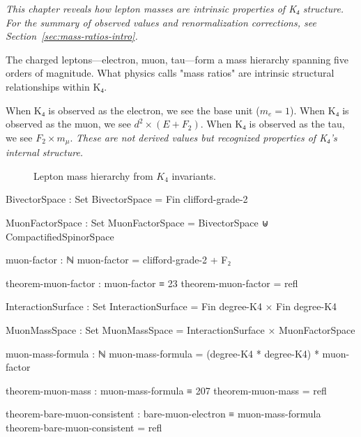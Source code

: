 \documentclass[11pt,a4paper]{book}
\begin{document}
\noindent\textit{This chapter reveals how lepton masses are intrinsic properties of K₄ structure. For the summary of observed values and renormalization corrections, see Section~\ref{sec:mass-ratios-intro}.}

\medskip
The charged leptons---electron, muon, tau---form a mass hierarchy spanning five orders of magnitude. What physics calls "mass ratios" are intrinsic structural relationships within K₄.

When K₄ is observed as the electron, we see the base unit ($m_e = 1$). When K₄ is observed as the muon, we see $d^2 \times (E + F_2)$. When K₄ is observed as the tau, we see $F_2 \times m_\mu$. \emph{These are not derived values but recognized properties of K₄'s internal structure.}

\begin{figure}[h]
\centering
{}
\caption{Lepton mass hierarchy from $K_4$ invariants.}
\label{fig:lepton-masses}
\end{figure}

\begin{code}
BivectorSpace : Set
BivectorSpace = Fin clifford-grade-2

MuonFactorSpace : Set
MuonFactorSpace = BivectorSpace ⊎ CompactifiedSpinorSpace

muon-factor : ℕ
muon-factor = clifford-grade-2 + F₂

theorem-muon-factor : muon-factor ≡ 23
theorem-muon-factor = refl
\end{code}

\begin{code}
InteractionSurface : Set
InteractionSurface = Fin degree-K4 × Fin degree-K4

MuonMassSpace : Set
MuonMassSpace = InteractionSurface × MuonFactorSpace

muon-mass-formula : ℕ
muon-mass-formula = (degree-K4 * degree-K4) * muon-factor

theorem-muon-mass : muon-mass-formula ≡ 207
theorem-muon-mass = refl

theorem-bare-muon-consistent : bare-muon-electron ≡ muon-mass-formula
theorem-bare-muon-consistent = refl
\end{code}
\end{document}
